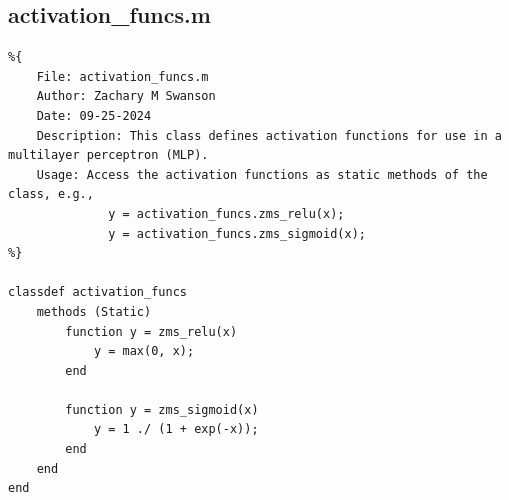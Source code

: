 \documentclass[11pt,pdftex,portrait,letterpaper]{article}
\begin{document}
\newpage
\subsection{activation\_funcs.m} \label{sec:appActFn}
\begin{lstlisting}
%{
    File: activation_funcs.m
    Author: Zachary M Swanson
    Date: 09-25-2024
    Description: This class defines activation functions for use in a multilayer perceptron (MLP).
    Usage: Access the activation functions as static methods of the class, e.g.,
              y = activation_funcs.zms_relu(x);
              y = activation_funcs.zms_sigmoid(x);
%}

classdef activation_funcs
    methods (Static)
        function y = zms_relu(x)
            y = max(0, x);
        end

        function y = zms_sigmoid(x)
            y = 1 ./ (1 + exp(-x));
        end
    end
end
\end{lstlisting}
\end{document}
